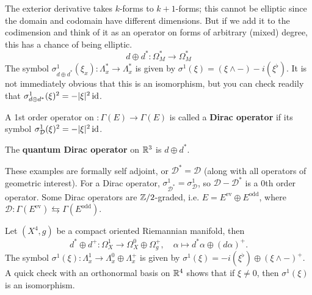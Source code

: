 \begin{example}
    The exterior derivative takes $k$-forms to $k+1$-forms; this cannot be elliptic since the domain and codomain have different dimensions. But if we add it to the codimension and think of it as an operator on forms of arbitrary (mixed) degree, this has a chance of being elliptic. \[
    d \oplus d^* \colon \Omega^*_M \to \Omega^*_M
\] The symbol $\sigma^1 _{d\oplus d^*}(\xi_x) \colon \Lambda^*_x \to \Lambda^*_x$ is given by $\sigma^1(\xi) = (\xi \wedge -) - i(\xi^{\flat})$. It is not immediately obvious that this is an isomorphism, but you can check readily that $\sigma^1 _{d\oplus d^*}(\xi)^2 = -|\xi|^2\operatorname{id}$.
\end{example}
\begin{definition}[]
    A 1st order operator on $\mathcal \colon \Gamma (E) \to \Gamma (E)$ is called a \textbf{Dirac operator} if its symbol $\sigma^1 _{\mathcal D}(\xi)^2 = -|\xi|^2 \operatorname{id}$. 
\end{definition}
\begin{example}
    The \textbf{quantum Dirac operator}  on $\mathbb{R}^3$ is $d\oplus d^*$.
\end{example}
These examples are formally self adjoint, or $\mathcal D^* = \mathcal D$ (along with all operators of geometric interest). For a Dirac operator, $\sigma^1_{\mathcal D^*}=\sigma^1 _{\mathcal D}$, so $\mathcal D - \mathcal D^*$ is a 0th order operator. Some Dirac operators are $\mathbb{Z}/2$-graded, i.e. $E = E ^{\mathrm{ev}}\oplus E ^{\mathrm{odd}}$, where $\mathcal D \colon \Gamma(E ^{\mathrm{ev}}) \leftrightarrows \Gamma (E ^{\mathrm{odd}})  $. 
\begin{example}
    Let $(X^4, g)$ be a compact oriented Riemannian manifold, then \[
        d^* \oplus d^+ \colon \Omega^1_X \to \Omega^0_X \oplus \Omega^+_g,\quad \alpha  \mapsto  d^* \alpha  \oplus (d\alpha )^+.
    \] The symbol $\sigma^1 (\xi) \colon \Lambda^1_x \to \Lambda^0_x \oplus \Lambda^+_x$ is given by $\sigma^1(\xi) = -i(\xi ^{\flat})\oplus (\xi \wedge -)^+$. A quick check with an orthonormal basis on $\mathbb{R}^4$ shows that if $\xi\neq 0$, then $\sigma^1(\xi)$ is an isomorphism.
\end{example}
